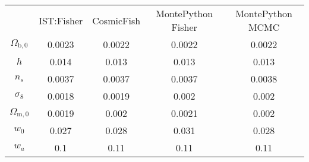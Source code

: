 \begin{table}
\centering
\begin{tabular}{|c|c|c|c|c|}
 & IST:Fisher & CosmicFish & MontePython Fisher & MontePython MCMC \\
$\Omega_{\mathrm{b},0}$ & 0.0023 & 0.0022 & 0.0022 & 0.0022 \\
$h$ & 0.014 & 0.013 & 0.013 & 0.013 \\
$n_s$ & 0.0037 & 0.0037 & 0.0037 & 0.0038 \\
$\sigma_8$ & 0.0018 & 0.0019 & 0.002 & 0.002 \\
$\Omega_{\mathrm{m},0}$ & 0.0019 & 0.002 & 0.0021 & 0.002 \\
$w_0$ & 0.027 & 0.028 & 0.031 & 0.028 \\
$w_a$ & 0.1 & 0.11 & 0.11 & 0.11 \\
\end{tabular}
\end{table}
